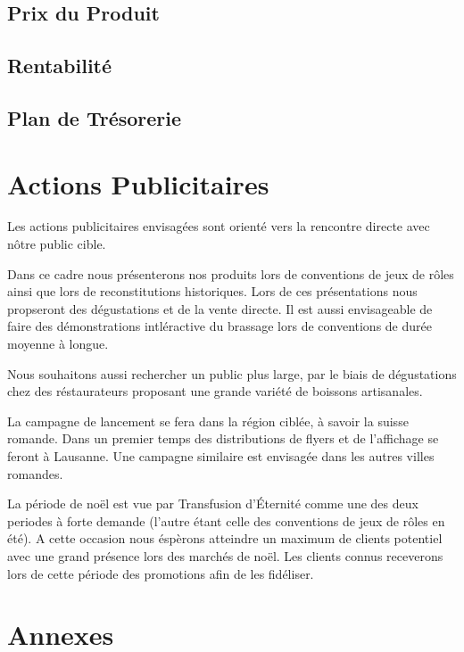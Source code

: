 \documentclass[10pt,a4paper]{article}
\newcommand{\tde}{Transfusion d'Éternité}
\begin{document}
\subsection{Prix du Produit}
\subsection{Rentabilité}
\subsection{Plan de Trésorerie}
\section{Actions Publicitaires}
Les actions publicitaires envisagées sont orienté vers la rencontre directe avec nôtre public cible.

Dans ce cadre nous présenterons nos produits lors de conventions de jeux de rôles ainsi que lors de reconstitutions historiques.
Lors de ces présentations nous propseront des dégustations et de la vente directe.
Il est aussi envisageable de faire des démonstrations intléractive du brassage lors de conventions de durée moyenne à longue.

Nous souhaitons aussi rechercher un public plus large, par le biais de dégustations chez des réstaurateurs proposant une grande variété de boissons artisanales.

La campagne de lancement se fera dans la région ciblée, à savoir la suisse romande.
Dans un premier temps des distributions de flyers et de l'affichage se feront à Lausanne.
Une campagne similaire est envisagée dans les autres villes romandes.

La période de noël est vue par \tde{} comme une des deux periodes à forte demande (l'autre étant celle des conventions de jeux de rôles en été).
A cette occasion nous éspèrons atteindre un maximum de clients potentiel avec une grand présence lors des marchés de noël.
Les clients connus receverons lors de cette période des promotions afin de les fidéliser.
\section{Annexes}
\end{document}
